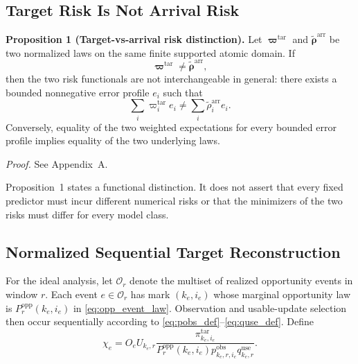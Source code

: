 \documentclass[letterpaper,journal]{IEEEtran}
\begin{document}
\subsection{Target Risk Is Not Arrival Risk}
\label{subsec:prop_risk}

\noindent\textbf{Proposition 1 (Target-vs-arrival risk distinction).}
Let $\boldsymbol\varpi^{\mathrm{tar}}$ and
$\widetilde{\boldsymbol\rho}^{\mathrm{arr}}$ be two normalized laws on the same
finite supported atomic domain.  If
\begin{equation}
    \boldsymbol\varpi^{\mathrm{tar}}
    \neq
    \widetilde{\boldsymbol\rho}^{\mathrm{arr}},
    \label{eq:dist_not_equal}
\end{equation}
then the two risk functionals are not interchangeable in general: there exists
a bounded nonnegative error profile $e_i$ such that
\begin{equation}
 \sum_i
 \varpi_i^{\mathrm{tar}}e_i
 \neq
 \sum_i
 \widetilde\rho_i^{\mathrm{arr}}e_i.
 \label{eq:prop1_nonidentity}
\end{equation}
Conversely, equality of the two weighted expectations for every bounded error
profile implies equality of the two underlying laws.

\noindent\emph{Proof.}
See Appendix~A.

Proposition~1 states a functional distinction.  It does not assert that every
fixed predictor must incur different numerical risks or that the minimizers of
the two risks must differ for every model class.

\subsection{Normalized Sequential Target Reconstruction}
\label{subsec:prop_reconstruction}

For the ideal analysis, let $\mathcal{O}_r$ denote the multiset of realized
opportunity events in window $r$.  Each event $e\in\mathcal{O}_r$ has mark
$(k_e,i_e)$ whose marginal opportunity law is
$P_r^{\mathrm{opp}}(k_e,i_e)$ in \eqref{eq:opp_event_law}.  Observation and
usable-update selection then occur sequentially according to
\eqref{eq:pobs_def}--\eqref{eq:quse_def}.  Define
\begin{equation}
 \chi_e
 =
 O_e U_{k_e,r}
 \frac{
 \pi^{\mathrm{tar}}_{k_e,i_e}
 }{
 P_r^{\mathrm{opp}}(k_e,i_e)
 p^{\mathrm{obs}}_{k_e,r,i_e}
 q^{\mathrm{use}}_{k_e,r}
 }.
 \label{eq:chi_event}
\end{equation}
\end{document}
